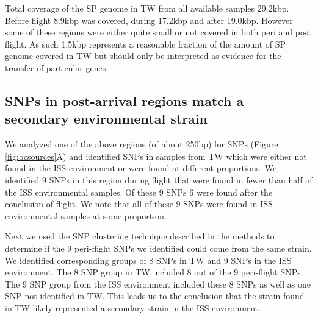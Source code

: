 Total coverage of the SP genome in TW from all available samples 29.2kbp. Before flight 8.9kbp was covered, during 17.2kbp and after 19.0kbp. However some of these regions were either quite small or not covered in both peri and post flight. As such 1.5kbp represents a reasonable fraction of the amount of SP genome covered in TW but should only be interpreted as evidence for the transfer of particular genes. 


\subsection{SNPs in post-arrival regions match a secondary environmental strain}

We analyzed one of the above regions (of about 250bp) for SNPs (Figure \ref{fig:bcsources}A) and identified SNPs in samples from TW which were either not found in the ISS environment or were found at different proportions. We identified 9 SNPs in this region during flight that were found in fewer than half of the ISS environmental samples. Of these 9 SNPs 6 were found after the conclusion of flight. We note that all of these 9 SNPs were found in ISS environmental samples at some proportion.

Next we used the SNP clustering technique described in the methods to determine if the 9 peri-flight SNPs we identified could come from the same strain. We identified corresponding groups of 8 SNPs in TW and 9 SNPs in the ISS environment. The 8 SNP group in TW included 8 out of the 9 peri-flight SNPs. The 9 SNP group from the ISS environment included these 8 SNPs as well as one SNP not identified in TW. This leads us to the conclusion that the strain found in TW likely represented a secondary strain in the ISS environment. 

